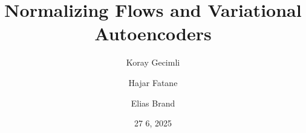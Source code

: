 



\title[Latent variable models]{Normalizing Flows and Variational Autoencoders}

\author[K.\,Gecimli, H.\,Fatane \& E.\,Brand]
       {Koray Gecimli \and Hajar Fatane \and Elias Brand}


\vspace{-2cm}\date{27 6, 2025}